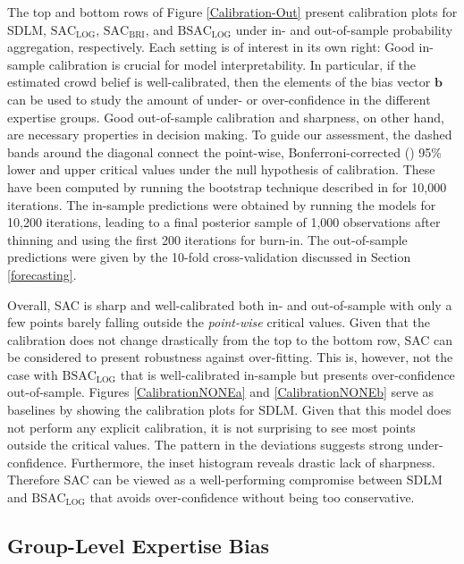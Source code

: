 \documentclass[aoas, preprint]{imsart}
\numberwithin{equation}{section}
\theoremstyle{plain}
\begin{document}
The top and bottom rows of Figure \ref{Calibration-Out} present calibration plots for SDLM, $\text{SAC}_{\text{LOG}}$, $\text{SAC}_{\text{BRI}}$, and $\text{BSAC}_{\text{LOG}}$ under in- and out-of-sample probability aggregation, respectively. Each setting is of interest in its own right:  Good in-sample calibration is crucial for model interpretability. In particular, if the estimated crowd belief is well-calibrated, then the elements of the bias vector $\boldsymbol{b}$ can be used to study the amount of under- or over-confidence in the different expertise groups. Good out-of-sample calibration and sharpness, on other hand, are necessary properties in decision making.  To guide our assessment, the dashed bands around the diagonal connect the point-wise, Bonferroni-corrected (\citet{bonferroni}) 95\% lower and upper critical values under the null hypothesis of calibration. These have been computed by running the bootstrap technique described in \citet{brocker2007increasing} for 10,000 iterations. The in-sample predictions were obtained by running the models for 10,200 iterations, leading to a final posterior sample of 1,000 observations after thinning and using the first 200 iterations for burn-in. The out-of-sample predictions were given by the 10-fold cross-validation discussed in Section \ref{forecasting}.

Overall, SAC is sharp and well-calibrated both in- and out-of-sample with only a few points barely falling outside the \textit{point-wise} critical values. Given that the calibration does not change drastically from the top to the bottom row, SAC can be considered to present robustness against over-fitting. This is, however, not the case with $\text{BSAC}_{\text{LOG}}$ that is well-calibrated in-sample but presents over-confidence out-of-sample. Figures \ref{CalibrationNONEa} and \ref{CalibrationNONEb} serve as baselines by showing the calibration plots for SDLM. Given that this model does not perform any explicit calibration, it is not surprising to see most points outside the critical values. The pattern in the deviations suggests strong under-confidence. Furthermore, the inset histogram reveals drastic lack of sharpness. Therefore SAC can be viewed as a well-performing compromise between SDLM and $\text{BSAC}_{\text{LOG}}$ that avoids over-confidence without being too conservative. 
 


\subsection{Group-Level Expertise Bias}
\label{ExpertBias}
\end{document}
